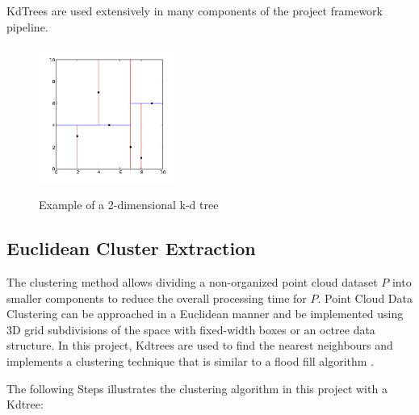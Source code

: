 \documentclass[12pt]{report}
\begin{document}
KdTrees are used extensively in many components of the project framework pipeline.
\begin{figure}[H]%
  \centering
  \includegraphics[width=0.4\textwidth]{2d_kdtree.png}
 \caption{Example of a 2-dimensional k-d tree}\cite[]{Rusu_ICRA2011_PCL}
 \label{fig:kdtree} 
\end{figure}






\subsection{Euclidean Cluster Extraction}
\label{section:Euclidean Cluster Extraction}

The clustering method allows dividing a non-organized point cloud dataset \textbf{$P$} into smaller components to reduce the overall processing time for \textbf{$P$}.
Point Cloud Data Clustering can be approached in a Euclidean manner and be implemented using 3D grid subdivisions of the space with fixed-width boxes or an octree data structure.
In this project, Kdtrees are used to find the nearest neighbours and implements a clustering technique that is similar to a flood fill algorithm .

The following Steps illustrates the clustering algorithm in this project with a Kdtree:
\end{document}
